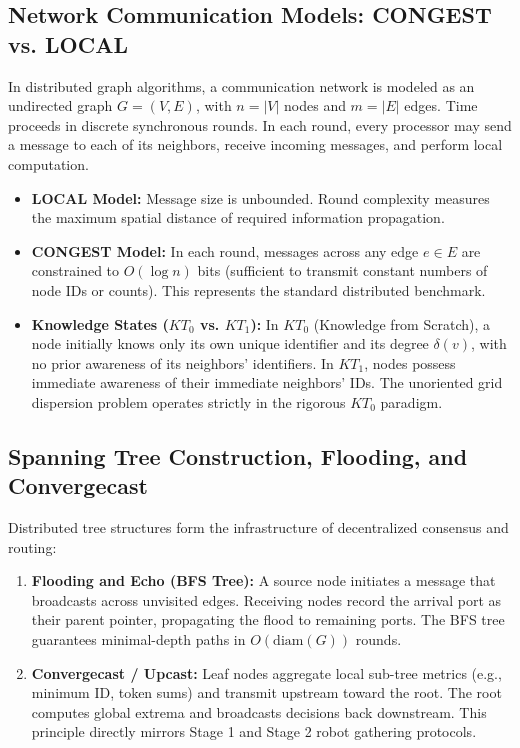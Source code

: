 \documentclass[11pt,a4paper]{report}
\begin{document}
\subsection{Network Communication Models: CONGEST vs. LOCAL}
In distributed graph algorithms, a communication network is modeled as an undirected graph $G = (V, E)$, with $n = |V|$ nodes and $m = |E|$ edges. Time proceeds in discrete synchronous rounds. In each round, every processor may send a message to each of its neighbors, receive incoming messages, and perform local computation.
\begin{itemize}
    \item \textbf{LOCAL Model:} Message size is unbounded. Round complexity measures the maximum spatial distance of required information propagation.
    \item \textbf{CONGEST Model:} In each round, messages across any edge $e \in E$ are constrained to $O(\log n)$ bits (sufficient to transmit constant numbers of node IDs or counts). This represents the standard distributed benchmark.
    \item \textbf{Knowledge States ($KT_0$ vs. $KT_1$):} In $KT_0$ (Knowledge from Scratch), a node initially knows only its own unique identifier and its degree $\delta(v)$, with no prior awareness of its neighbors' identifiers. In $KT_1$, nodes possess immediate awareness of their immediate neighbors' IDs. The unoriented grid dispersion problem operates strictly in the rigorous $KT_0$ paradigm.
\end{itemize}

\subsection{Spanning Tree Construction, Flooding, and Convergecast}
Distributed tree structures form the infrastructure of decentralized consensus and routing:
\begin{enumerate}
    \item \textbf{Flooding and Echo (BFS Tree):} A source node initiates a message that broadcasts across unvisited edges. Receiving nodes record the arrival port as their parent pointer, propagating the flood to remaining ports. The BFS tree guarantees minimal-depth paths in $O(\text{diam}(G))$ rounds.
    \item \textbf{Convergecast / Upcast:} Leaf nodes aggregate local sub-tree metrics (e.g., minimum ID, token sums) and transmit upstream toward the root. The root computes global extrema and broadcasts decisions back downstream. This principle directly mirrors Stage 1 and Stage 2 robot gathering protocols.
\end{enumerate}
\end{document}
